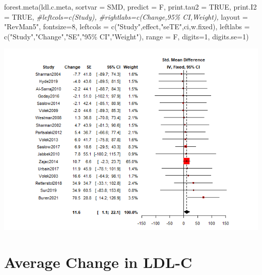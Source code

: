 \documentclass[
]{article}
\newenvironment{Shaded}{\begin{snugshade}}{\end{snugshade}}
\newcommand{\AttributeTok}[1]{\textcolor[rgb]{0.77,0.63,0.00}{#1}}
\newcommand{\CommentTok}[1]{\textcolor[rgb]{0.56,0.35,0.01}{\textit{#1}}}
\newcommand{\ConstantTok}[1]{\textcolor[rgb]{0.00,0.00,0.00}{#1}}
\newcommand{\DecValTok}[1]{\textcolor[rgb]{0.00,0.00,0.81}{#1}}
\newcommand{\FunctionTok}[1]{\textcolor[rgb]{0.00,0.00,0.00}{#1}}
\newcommand{\NormalTok}[1]{#1}
\newcommand{\StringTok}[1]{\textcolor[rgb]{0.31,0.60,0.02}{#1}}
\begin{document}
\begin{Shaded}
\begin{Highlighting}[]
\FunctionTok{forest.meta}\NormalTok{(ldl.c.meta, }
            \AttributeTok{sortvar =}\NormalTok{ SMD,}
            \AttributeTok{predict =}\NormalTok{ F, }
            \AttributeTok{print.tau2 =} \ConstantTok{TRUE}\NormalTok{,}
            \AttributeTok{print.I2 =} \ConstantTok{TRUE}\NormalTok{,}
            \CommentTok{\#leftcols=c(\textquotesingle{}Study\textquotesingle{}),}
            \CommentTok{\#rightlabs=c(\textquotesingle{}Change\textquotesingle{},\textquotesingle{}95\% CI\textquotesingle{},\textquotesingle{}Weight\textquotesingle{}),}
            \AttributeTok{layout =} \StringTok{"RevMan5"}\NormalTok{,}
            \AttributeTok{fontsize=}\DecValTok{8}\NormalTok{,}
            \AttributeTok{leftcols =} \FunctionTok{c}\NormalTok{(}\StringTok{"Study"}\NormalTok{,}\StringTok{\textquotesingle{}effect\textquotesingle{}}\NormalTok{,}\StringTok{"seTE"}\NormalTok{,}\StringTok{\textquotesingle{}ci\textquotesingle{}}\NormalTok{,}\StringTok{\textquotesingle{}w.fixed\textquotesingle{}}\NormalTok{),}
            \AttributeTok{leftlabs =} \FunctionTok{c}\NormalTok{(}\StringTok{"Study"}\NormalTok{,}\StringTok{"Change"}\NormalTok{,}\StringTok{"SE"}\NormalTok{,}\StringTok{"95\% CI"}\NormalTok{,}\StringTok{"Weight"}\NormalTok{),}
            \AttributeTok{range =}\NormalTok{ F,}
            \AttributeTok{digits=}\DecValTok{1}\NormalTok{,}
            \AttributeTok{digits.se=}\DecValTok{1}\NormalTok{)}
\end{Highlighting}
\end{Shaded}

\includegraphics{figures/meta-analysis-1.png}

\hypertarget{average-change-in-ldl-c}{%
\section{Average Change in LDL-C}\label{average-change-in-ldl-c}}
\end{document}
